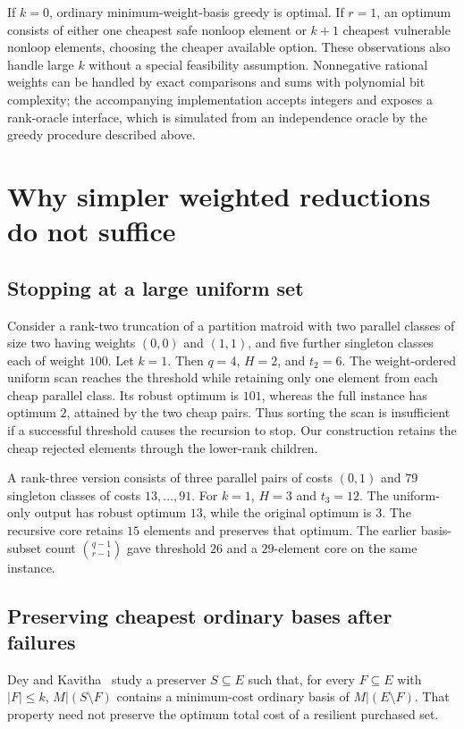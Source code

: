 \documentclass[11pt]{article}
\theoremstyle{definition}\newtheorem{definition}[theorem]{Definition}
\theoremstyle{remark}\newtheorem{remark}[theorem]{Remark}
\begin{document}
If $k=0$, ordinary minimum-weight-basis greedy is optimal. If $r=1$, an optimum consists of either one cheapest safe nonloop element or $k+1$ cheapest vulnerable nonloop elements, choosing the cheaper available option. These observations also handle large $k$ without a special feasibility assumption. Nonnegative rational weights can be handled by exact comparisons and sums with polynomial bit complexity; the accompanying implementation accepts integers and exposes a rank-oracle interface, which is simulated from an independence oracle by the greedy procedure described above.

\section{Why simpler weighted reductions do not suffice}
\subsection{Stopping at a large uniform set}
Consider a rank-two truncation of a partition matroid with two parallel classes of size two having weights $(0,0)$ and $(1,1)$, and five further singleton classes each of weight $100$. Let $k=1$. Then $q=4$, $H=2$, and $t_2=6$. The weight-ordered uniform scan reaches the threshold while retaining only one element from each cheap parallel class. Its robust optimum is $101$, whereas the full instance has optimum $2$, attained by the two cheap pairs. Thus sorting the scan is insufficient if a successful threshold causes the recursion to stop. Our construction retains the cheap rejected elements through the lower-rank children.

A rank-three version consists of three parallel pairs of costs $(0,1)$ and $79$ singleton classes of costs $13,\ldots,91$. For $k=1$, $H=3$ and $t_3=12$. The uniform-only output has robust optimum $13$, while the original optimum is $3$. The recursive core retains $15$ elements and preserves that optimum. The earlier basis-subset count $\binom{q-1}{r-1}$ gave threshold $26$ and a $29$-element core on the same instance.

\subsection{Preserving cheapest ordinary bases after failures}
Dey and Kavitha~\cite{DK} study a preserver $S\subseteq E$ such that, for every $F\subseteq E$ with $|F|\leq k$, $M|(S\setminus F)$ contains a minimum-cost ordinary basis of $M|(E\setminus F)$. That property need not preserve the optimum total cost of a resilient purchased set.
\end{document}
